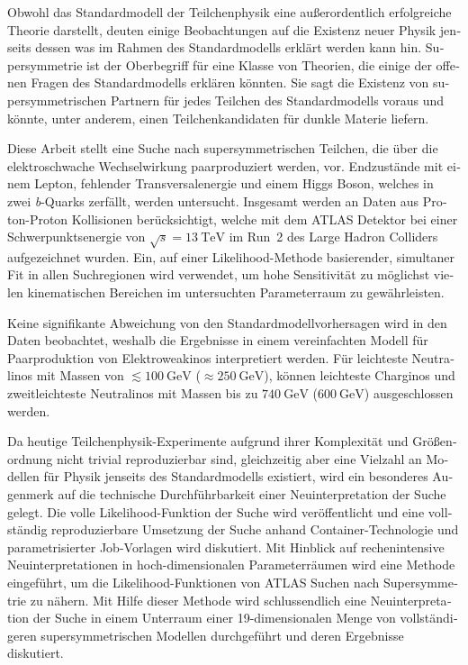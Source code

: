 
\begin{otherlanguage}{ngerman} 
\begin{zusammenfassung}

Obwohl das Standardmodell der Teilchenphysik eine außerordentlich erfolgreiche Theorie darstellt, deuten einige Beobachtungen auf die Existenz neuer Physik jenseits dessen was im Rahmen des Standardmodells erklärt werden kann hin.
Supersymmetrie ist der Oberbegriff für eine Klasse von Theorien, die einige der offenen Fragen des Standardmodells erklären könnten.
Sie sagt die Existenz von supersymmetrischen Partnern für jedes Teilchen des Standardmodells voraus und könnte, unter anderem, einen Teilchenkandidaten für dunkle Materie liefern. 

Diese Arbeit stellt eine Suche nach supersymmetrischen Teilchen, die über die elektroschwache Wechselwirkung paarproduziert werden, vor.
Endzustände mit einem Lepton, fehlender Transversalenergie und einem Higgs Boson, welches in zwei \textit{b}-Quarks zerfällt, werden untersucht.
Insgesamt werden \onethirtynineifb an Daten aus Proton-Proton Kollisionen berücksichtigt, welche mit dem ATLAS Detektor bei einer Schwerpunktsenergie von $\sqrt{s}=\SI{13}{\TeV}$ im Run~2 des Large Hadron Colliders aufgezeichnet wurden.
Ein, auf einer Likelihood-Methode basierender, simultaner Fit in allen Suchregionen wird verwendet, um hohe Sensitivität zu möglichst vielen kinematischen Bereichen im untersuchten Parameterraum zu gewährleisten.

Keine signifikante Abweichung von den Standardmodellvorhersagen wird in den Daten beobachtet, weshalb die Ergebnisse in einem vereinfachten Modell für Paarproduktion von Elektro\-weakinos interpretiert werden.
Für leichteste Neutralinos mit Massen von $\lesssim \SI{100}{\GeV}$ ($\approx\SI{250}{\GeV}$), können leichteste Charginos und zweitleichteste Neutralinos mit Massen bis zu $\SI{740}{\GeV}$ ($\SI{600}{\GeV}$) ausgeschlossen werden.

Da heutige Teilchenphysik-Experimente aufgrund ihrer Komplexität und Größenordnung nicht trivial reproduzierbar sind, gleichzeitig aber eine Vielzahl an Modellen für Physik jenseits des Standardmodells existiert, wird ein besonderes Augenmerk auf die technische Durchführbarkeit einer Neuinterpretation der Suche gelegt.
Die volle Likelihood-Funktion der Suche wird veröffentlicht und eine vollständig reproduzierbare Umsetzung der Suche anhand Container-Technologie und parametrisierter Job-Vorlagen wird diskutiert.
Mit Hinblick auf rechenintensive Neuinterpretationen in hoch-dimensionalen Parameter\-räumen wird eine Methode eingeführt, um die Likelihood-Funktionen von ATLAS Suchen nach Supersymmetrie zu nähern.
Mit Hilfe dieser Methode wird schlussendlich eine Neuinterpretation der Suche in einem Unterraum einer 19-dimensionalen Menge von vollständigeren supersymmetrischen Modellen durchgeführt und deren Ergebnisse diskutiert. 


\end{zusammenfassung}
\end{otherlanguage}
